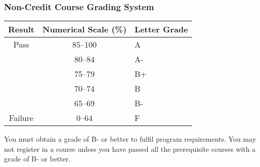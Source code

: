 \subsubsection{Non-Credit Course Grading System}

\begin{center}
  \begin{tabular}{ccl}
     Result & Numerical Scale (\%) & Letter Grade \\
   \hline
Pass & 85--100 & A  \\
& 80--84 & A- \\
& 75--79 & B+ \\
& 70--74 & B \\
& 65--69 & B- \\
\hline
Failure & 0--64 & F
  \end{tabular}
  \end{center}

You must obtain a grade of B- or better to fulfil program
requirements. You may not register in a course unless you have passed
all the prerequisite courses with a grade of B- or better.
